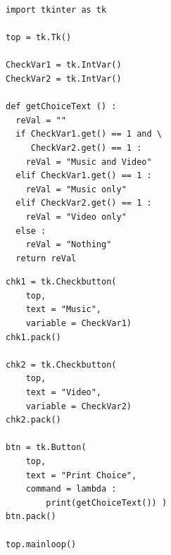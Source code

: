 \begin{frame}[fragile]
%
\begin{tcbraster}[raster columns=2,
                  raster equal height,
                  nobeforeafter,
                  raster column skip=0.5cm]
\begin{codebox}
\begin{verbatim}
import tkinter as tk

top = tk.Tk()

CheckVar1 = tk.IntVar()
CheckVar2 = tk.IntVar()

def getChoiceText () :
  reVal = ""
  if CheckVar1.get() == 1 and \
     CheckVar2.get() == 1 :
    reVal = "Music and Video"
  elif CheckVar1.get() == 1 :
    reVal = "Music only"
  elif CheckVar2.get() == 1 :
    reVal = "Video only"
  else :
    reVal = "Nothing"
  return reVal
\end{verbatim}
\end{codebox}
%
\begin{codebox}[... Continued]
\begin{verbatim}
chk1 = tk.Checkbutton(
    top,
    text = "Music",
    variable = CheckVar1)
chk1.pack()

chk2 = tk.Checkbutton(
    top,
    text = "Video",
    variable = CheckVar2)
chk2.pack()

btn = tk.Button(
    top,
    text = "Print Choice",
    command = lambda : 
        print(getChoiceText()) )
btn.pack()

top.mainloop()
\end{verbatim}
\end{codebox}
\end{tcbraster}
%
\end{frame}


